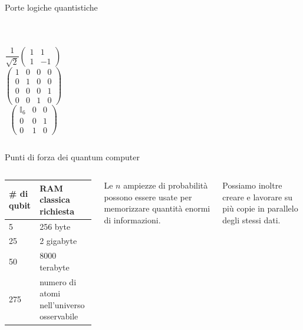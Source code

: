\documentclass{beamer}
\begin{document}
\begin{frame}{Porte logiche quantistiche}
\begin{columns}
\begin{figure}[h]
                \label{fig:toffoli}
            \end{figure}
        \end{columns}

        \vspace{-2em}

        \begin{columns}
            \begin{equation*}
                \frac{1}{\sqrt{2}}
                \begin{pmatrix}
                    1 & 1 \\ 1 & -1
                \end{pmatrix}
            \end{equation*}
            \begin{equation*}
                \begin{pmatrix}
                    1 & 0 & 0 & 0 \\
                    0 & 1 & 0 & 0 \\
                    0 & 0 & 0 & 1 \\
                    0 & 0 & 1 & 0
                \end{pmatrix}
            \end{equation*}
            \begin{equation*}
                \begin{pmatrix}
                    \mathbb{I}_6 & 0 & 0 \\
                    0 & 0 & 1 \\
                    0 & 1 & 0
                \end{pmatrix}
            \end{equation*}
        \end{columns}
    \end{frame}

    \begin{frame}{Punti di forza dei quantum computer}
        \begin{columns}
            \begin{tabular}{p{}p{}}
                \# di qubit & RAM classica richiesta \\ \hline
                5 & 256 byte \\ 
                25 & 2 gigabyte \\ 
                50 & 8000 terabyte \\ 
                275 & numero di atomi nell'universo osservabile 
            \end{tabular}
            Le $n$ ampiezze di probabilità possono essere usate per memorizzare quantità enormi di informazioni. 

            Possiamo inoltre creare e lavorare su più copie in parallelo degli stessi dati. 
        \end{columns}
    \end{frame}
\end{document}
